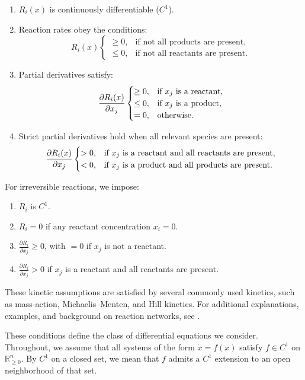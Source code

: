 \documentclass{article}
\begin{document}
\begin{enumerate}
    \item \( R_i(x) \) is continuously differentiable (\( C^1 \)).
    \item Reaction rates obey the conditions:
    \[
    R_i(x) 
    \begin{cases}
        \geq 0, & \text{if not all products are present,} \\
        \leq 0, & \text{if not all reactants are present.}
    \end{cases}
    \]
    \item Partial derivatives satisfy:
    \[
    \frac{\partial R_i(x)}{\partial x_j} 
    \begin{cases}
        \geq 0, & \text{if \( x_j \) is a reactant,} \\
        \leq 0, & \text{if \( x_j \) is a product,} \\
        = 0,  & \text{otherwise.}
    \end{cases}
    \]
    \item Strict partial derivatives hold when all relevant species are present:
    \[
    \frac{\partial R_i(x)}{\partial x_j} 
    \begin{cases}
        > 0, & \text{if \( x_j \) is a reactant and all reactants are present,} \\
        < 0, & \text{if \( x_j \) is a product and all products are present.}
    \end{cases}
    \]
\end{enumerate}

For irreversible reactions, we impose:
\begin{enumerate}
    \item \( R_i \) is \( C^1 \).
    \item \( R_i = 0 \) if any reactant concentration \( x_i = 0 \).
    \item \( \frac{\partial R_i}{\partial x_j} \geq 0 \), with \( = 0 \) if \( x_j \) is not a reactant.
    \item \( \frac{\partial R_i}{\partial x_j} > 0 \) if \( x_j \) is a reactant and all reactants are present.
\end{enumerate}

These kinetic assumptions are satisfied by several commonly used kinetics, such as mass-action, Michaelis–Menten, and Hill kinetics. For additional explanations, examples, and background on reaction networks, see \cite{ANGELI2008128}.


These conditions define the class of differential equations we consider. Throughout, we assume that all systems of the form \( \dot{x} = f(x) \) satisfy \( f \in C^1 \) on \( \mathbb{R}^n_{\geq 0} \). By \( C^1 \) on a closed set, we mean that \( f \) admits a \( C^1 \) extension to an open neighborhood of that set.
\end{document}
